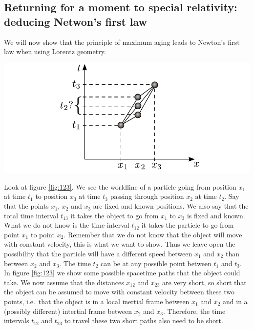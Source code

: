 {\begin{multicols}{2}
\subsection{Returning for a moment to special relativity: deducing Netwon's first law}

We will now show that the principle of maximum aging leads to Newton's first law when using Lorentz geometry.

\begin{Figure}
\centering
\includegraphics[width=\textwidth]{fig_15-3.pdf}
\end{Figure}


Look at figure \ref{fig:123}. We see the worldline of a particle going from position $x_1$ at time $t_1$ to position $x_3$ at time $t_3$ passing through position $x_2$ at time $t_2$. Say that the points $x_1$, $x_2$ and $x_3$ are fixed and known positions. We also say that the total time interval $t_{13}$ it takes the object to go from $x_1$ to $x_3$ is fixed and known. What we do not know is the time interval $t_{12}$ it takes the particle to go from point $x_1$ to point $x_2$. Remember that we do not know that the object will move with constant velocity, this is what we want to show. Thus we leave open the possibility that the particle will have a different speed between $x_1$ and $x_2$ than between $x_2$ and $x_3$. The time $t_2$ can be at any possible point between $t_1$ and $t_3$. In figure \ref{fig:123} we show some possible spacetime paths that the object could take. We now assume that the distances $x_{12}$ and $x_{23}$ are very short, so short that the object can be assumed to move with constant velocity between these two points, i.e.\ that the object is in a local inertial frame between $x_1$ and $x_2$ and in a (possibly different) intertial frame between $x_2$ and $x_3$. Therefore, the time intervals $t_{12}$ and $t_{23}$ to travel these two short paths also need to be short.


\end{multicols}}
